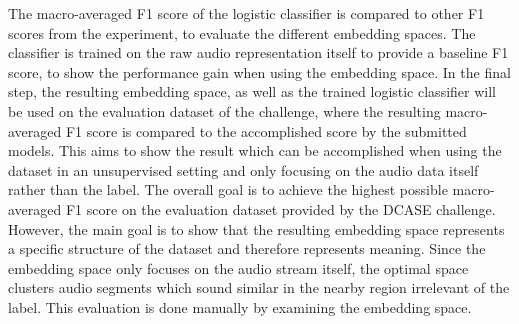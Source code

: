 \newline
\newline
The macro-averaged F1 score of the logistic classifier is compared to other F1 scores from the experiment, to evaluate the different embedding spaces. The classifier is trained on the raw audio representation itself to provide a baseline F1 score, to show the performance gain when using the embedding space.
\newline
\newline
In the final step, the resulting embedding space, as well as the trained logistic classifier will be used on the evaluation dataset of the challenge, where the resulting macro-averaged F1 score is compared to the accomplished score by the submitted models. This aims to show the result which can be accomplished when using the dataset in an unsupervised setting and only focusing on the audio data itself rather than the label.
\newline
\newline
The overall goal is to achieve the highest possible macro-averaged F1 score on the evaluation dataset provided by the DCASE challenge. 
\newline
\newline
However, the main goal is to show that the resulting embedding space represents a specific structure of the dataset and therefore represents meaning. Since the embedding space only focuses on the audio stream itself, the optimal space clusters audio segments which sound similar in the nearby region irrelevant of the label. This evaluation is done manually by examining the embedding space.
